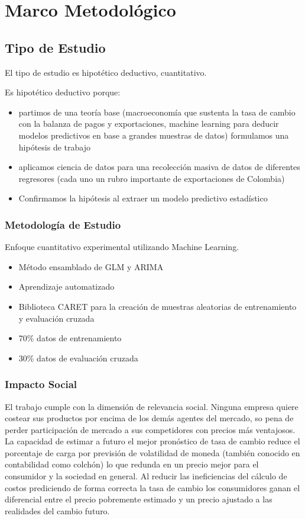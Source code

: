 \chapter{Marco Metodológico}

\section{Tipo de Estudio}
El tipo de estudio es hipotético deductivo, cuantitativo.

Es hipotético deductivo porque:

\begin{itemize}
\item partimos de una teoría base (macroeconomía que sustenta la tasa de cambio con la balanza de pagos y exportaciones, machine learning para deducir modelos predictivos en base a grandes muestras de datos) formulamos una hipótesis de trabajo
\item aplicamos ciencia de datos para una recolección masiva de datos de diferentes regresores (cada uno un rubro importante de exportaciones de Colombia)
\item Confirmamos la hipótesis al extraer un modelo predictivo estadístico  
\end{itemize}

\subsection{Metodología de Estudio}
Enfoque cuantitativo experimental utilizando Machine Learning.

\begin{itemize}
	\item Método ensamblado de GLM y ARIMA
	\item Aprendizaje automatizado
	\item Biblioteca CARET para la creación de muestras aleatorias de entrenamiento y evaluación cruzada
	\item 70\% datos de entrenamiento
	\item 30\% datos de evaluación cruzada
\end{itemize}
    
\subsection{Impacto Social}
El trabajo cumple con la dimensión de relevancia social. Ninguna empresa quiere costear sus productos por encima de los demás agentes del mercado, so pena de perder participación de mercado a sus competidores con precios más ventajosos. La capacidad de estimar a futuro el mejor pronóstico de tasa de cambio reduce el porcentaje de carga por previsión de volatilidad de moneda (también conocido en contabilidad como colchón) lo que redunda en un precio mejor para el consumidor y la sociedad en general. Al reducir las ineficiencias del cálculo de costos prediciendo de forma correcta la tasa de cambio los consumidores ganan el diferencial entre el precio pobremente estimado y un precio ajustado a las realidades del cambio futuro.

